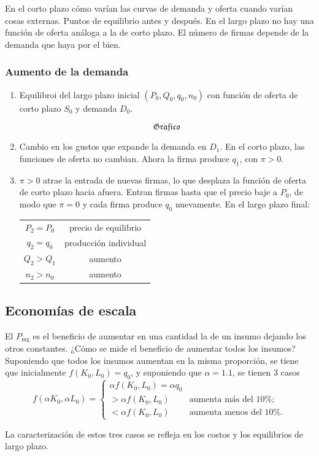 \documentclass{report}
\newcommand{\GRAF}{\begin{center}$$\mathfrak{Gr\acute{a}fico}$$\end{center}}
\renewcommand{\a}{\alpha}
\begin{document}
En el corto plazo cómo varían las curvas de demanda y oferta cuando varían cosas externas. Puntos de equilibrio antes y después. En el largo plazo no hay una función de oferta análoga a la de corto plazo. El número de firmas depende de la demanda que haya por el bien.

\subsubsection{Aumento de la demanda}

\begin{enumerate}
\item Equilibroi del largo plazo inicial $\left(P_0,Q_0,q_0,n_0\right)$ con función de oferta de corto plazo $S_0$ y demanda $D_0$.
\GRAF
\item Cambio en los gustos que expande la demanda en $D_1$. En el corto plazo, las funciones de oferta no cambian. Ahora la firma produce $q_1$, con $\pi>0$.
\item $\pi>0$ atrae la entrada de nuevas firmas, lo que desplaza la función de oferta de corto plazo hacia afuera. Entran firmas hasta que el precio baje a $P_0$, de modo que $\pi=0$ y cada firma produce $q_0$ nuevamente. En el largo plazo final:
\begin{center}
\begin{tabular}{c|c}
$P_2=P_0$ & precio de equilibrio \\
$q_2=q_0$ & producción individual \\
$Q_2>Q_1$ & aumento \\
$n_2>n_0$ & aumento
\end{tabular}
\end{center}
\end{enumerate}

\subsection{Economías de escala}

El $P_\text{mg}$ es el beneficio de aumentar en una cantidad la de un insumo dejando los otros constantes. ¿Cómo se mide el beneficio de aumentar todos los insumos? Suponiendo que todos los insumos aumentan en la misma proporción, se tiene que inicialmente $f\!\left(K_0,L_0\right)=q_0$, y suponiendo que $\a=1.1$, se tienen 3 casos
\[
f\!\left(\a K_0,\a L_0\right)=\begin{cases}
\a f\!\left(K_0,L_0\right)=\a q_0 \\
>\a f\!\left(K_0,L_0\right) & \text{aumenta más del 10\%;} \\
<\a f\!\left(K_0,L_0\right) & \text{aumenta menos del 10\%.}
\end{cases}
\]

La caracterización de estos tres casos se refleja en los costos y los equilibrios de largo plazo.
\end{document}
